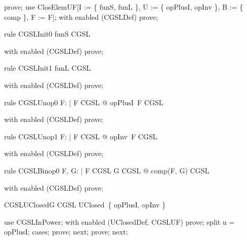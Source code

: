 \documentclass{article}
\begin{document}
\begin{zproof}
prove;
use ClosElemUF[I := \{ funS, funL \}, U := \{ opPlusI, opInv \}, B := \{ comp \}, F := F];
with enabled (CGSLDef) prove;
\end{zproof}

\begin{theorem}{rule CGSLInit0}
  funS \in CGSL
\end{theorem}

\begin{zproof}
with enabled (CGSLDef) prove;
\end{zproof}

\begin{theorem}{rule CGSLInit1}
  funL \in CGSL
\end{theorem}

\begin{zproof}
with enabled (CGSLDef) prove;
\end{zproof}

\begin{theorem}{rule CGSLUnop0}
  \forall F: \nat \fun \nat | F \in CGSL @ opPlusI~F \in CGSL
\end{theorem}

\begin{zproof}
with enabled (CGSLDef) prove;
\end{zproof}

\begin{theorem}{rule CGSLUnop1}
  \forall F: \nat \fun \nat | F \in CGSL @ opInv~F \in CGSL
\end{theorem}

\begin{zproof}
with enabled (CGSLDef) prove;
\end{zproof}

\begin{theorem}{rule CGSLBinop0}
  \forall F, G: \nat \fun \nat | F \in CGSL \land G \in CGSL @ comp(F, G) \in CGSL
\end{theorem}

\begin{zproof}
with enabled (CGSLDef) prove;
\end{zproof}

\begin{theorem}{CGSLUClosedG}
  CGSL \in UClosed~\{ opPlusI, opInv \}
\end{theorem}

\begin{zproof}
use CGSLInPower;
with enabled (UClosedDef, CGSLUF) prove;
split u = opPlusI;
cases;
prove;
next;
prove;
next;
\end{zproof}
\end{document}

